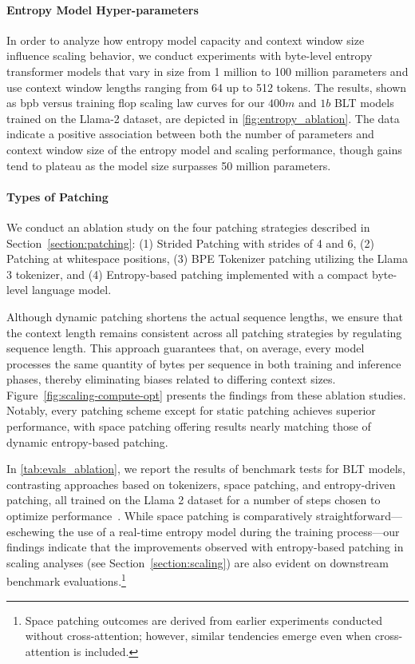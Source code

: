 \paragraph{Entropy Model Hyper-parameters} In order to analyze how entropy model capacity and context window size influence scaling behavior, we conduct experiments with byte-level entropy transformer models that vary in size from 1 million to 100 million parameters and use context window lengths ranging from 64 up to 512 tokens. The results, shown as bpb versus training flop scaling law curves for our $400m$ and $1b$ {\textsc BLT} models trained on the Llama-2 dataset, are depicted in \autoref{fig:entropy_ablation}. The data indicate a positive association between both the number of parameters and context window size of the entropy model and scaling performance, though gains tend to plateau as the model size surpasses 50 million parameters.

\paragraph{Types of Patching}

We conduct an ablation study on the four patching strategies described in Section~\ref{section:patching}: (1) Strided Patching with strides of 4 and 6, (2) Patching at whitespace positions, (3) BPE Tokenizer patching utilizing the Llama 3 tokenizer, and (4) Entropy-based patching implemented with a compact byte-level language model.

Although dynamic patching shortens the actual sequence lengths, we ensure that the context length remains consistent across all patching strategies by regulating sequence length. This approach guarantees that, on average, every model processes the same quantity of bytes per sequence in both training and inference phases, thereby eliminating biases related to differing context sizes. Figure~\ref{fig:scaling-compute-opt} presents the findings from these ablation studies. Notably, every patching scheme except for static patching achieves superior performance, with space patching offering results nearly matching those of dynamic entropy-based patching.

In \autoref{tab:evals_ablation}, we report the results of benchmark tests for {\textsc BLT} models, contrasting approaches based on tokenizers, space patching, and entropy-driven patching, all trained on the Llama 2 dataset for a number of steps chosen to optimize performance~\citep{dubey2024llama}. While space patching is comparatively straightforward—eschewing the use of a real-time entropy model during the training process—our findings indicate that the improvements observed with entropy-based patching in scaling analyses (see Section~\ref{section:scaling}) are also evident on downstream benchmark evaluations.\footnote{Space patching outcomes are derived from earlier experiments conducted without cross-attention; however, similar tendencies emerge even when cross-attention is included.}

